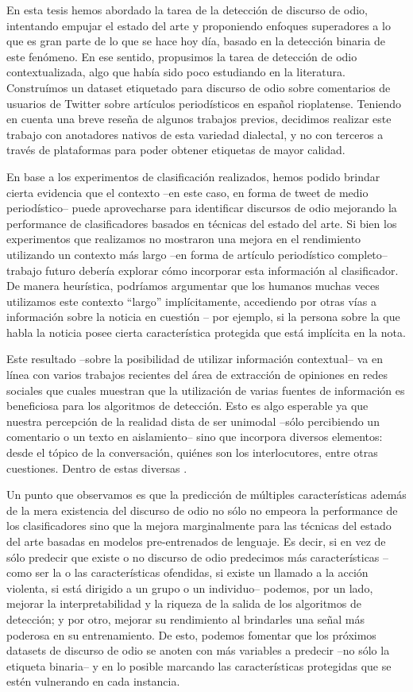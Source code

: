 En esta tesis hemos abordado la tarea de la detección de discurso de odio, intentando empujar el estado del arte y proponiendo enfoques superadores a lo que es gran parte de lo que se hace hoy día, basado en la detección binaria de este fenómeno. En ese sentido, propusimos la tarea de detección de odio contextualizada, algo que había sido poco estudiando en la literatura. Construímos un dataset etiquetado para discurso de odio sobre comentarios de usuarios de Twitter sobre artículos periodísticos en español rioplatense. Teniendo en cuenta una breve reseña de algunos trabajos previos, decidimos realizar este trabajo con anotadores nativos de esta variedad dialectal, y no con terceros a través de plataformas para poder obtener etiquetas de mayor calidad.

En base a los experimentos de clasificación realizados, hemos podido brindar cierta evidencia que el contexto --en este caso, en forma de tweet de medio periodístico-- puede aprovecharse para identificar discursos de odio mejorando la performance de clasificadores basados en técnicas del estado del arte. Si bien los experimentos que realizamos no mostraron una mejora en el rendimiento utilizando un contexto más largo --en forma de artículo periodístico completo-- trabajo futuro debería explorar cómo incorporar esta información al clasificador. De manera heurística, podríamos argumentar que los humanos muchas veces utilizamos este contexto ``largo'' implícitamente, accediendo por otras vías a información sobre la noticia en cuestión -- por ejemplo, si la persona sobre la que habla la noticia posee cierta característica protegida que está implícita en la nota.

Este resultado --sobre la posibilidad de utilizar información contextual-- va en línea con varios trabajos recientes del área de extracción de opiniones en redes sociales que cuales muestran que la utilización de varias fuentes de información es beneficiosa para los algoritmos de detección. Esto es algo esperable ya que nuestra percepción de la realidad dista de ser unimodal --sólo percibiendo un comentario o un texto en aislamiento-- sino que incorpora diversos elementos: desde el tópico de la conversación, quiénes son los interlocutores, entre otras cuestiones. Dentro de estas diversas .

Un punto que observamos es que la predicción de múltiples características además de la mera existencia del discurso de odio no sólo no empeora la performance de los clasificadores sino que la mejora marginalmente para las técnicas del estado del arte basadas en modelos pre-entrenados de lenguaje. Es decir, si en vez de sólo predecir que existe o no discurso de odio predecimos más características --como ser la o las características ofendidas, si existe un llamado a la acción violenta, si está dirigido a un grupo o un individuo-- podemos, por un lado, mejorar la interpretabilidad y la riqueza de la salida de los algoritmos de detección; y por otro, mejorar su rendimiento al brindarles una señal más poderosa en su entrenamiento. De esto, podemos fomentar que los próximos datasets de discurso de odio se anoten con más variables a predecir --no sólo la etiqueta binaria-- y en lo posible marcando las características protegidas que se estén vulnerando en cada instancia.


